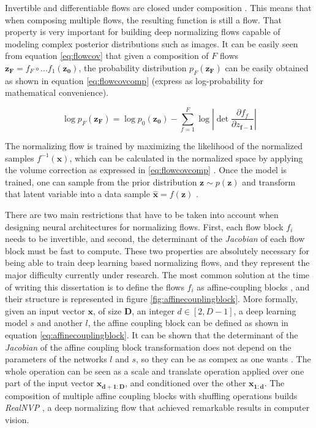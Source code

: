 Invertible and differentiable flows are closed under composition \autocite{kobyzev}. This means that when composing multiple flows, the resulting function is still a flow. That property is very important for building deep normalizing flows capable of modeling complex posterior distributions such as images. It can be easily seen from equation \ref{eq:flowcov}  \autocite{rezende2015} that given a composition of $F$ flows $\mathbf{z_F}=f_F \circ ... f_1(\mathbf{z_0})$, the probability distribution $p_F(\mathbf{z_F})$ can be easily obtained as shown in equation \ref{eq:flowcovcomp} (express as log-probability for mathematical convenience).

\begin{equation}
\label{eq:flowcovcomp}
\log p_F(\mathbf{z_F}) = \log p_0(\mathbf{z_0}) - \sum_{f=1}^{F} \log  \left| \det \frac{\partial f_f}{\partial z_{\mathbf{f-1}}} \right|
\end{equation}


The normalizing flow is trained by maximizing the likelihood of the normalized samples $f^{-1}(\mathbf{x})$, which can be calculated in the normalized space by applying the volume correction as expressed in \ref{eq:flowcovcomp} \autocite{papamakarios2017}. Once the model is trained, one can sample from the prior distribution $\mathbf{z} \sim p(\mathbf{z})$ and transform that latent variable into a data sample $\hat{\mathbf{x}} = f(\mathbf{z})$ \autocite{rezende2015}.

There are two main restrictions that have to be taken into account when designing neural architectures for normalizing flows. First, each flow block $f_i$ needs to be invertible, and second, the determinant of the \textit{Jacobian} of each flow block must be fast to compute. These two properties are absolutely necessary for being able to train deep learning based normalizing flows, and they represent the major difficulty currently under research. The most common solution at the time of writing this dissertation is to define the flows $f_i$ as affine-coupling blocks \autocite{dinh2018}, and their structure is represented in figure \ref{fig:affinecouplingblock}. More formally, given an input vector $\mathbf{x}$, of size $\mathbf{D}$, an integer $d \in [2,D-1]$, a deep learning model $s$ and another $l$, the affine coupling block can be defined as shown in equation \ref{eq:affinecouplingblock}. It can be shown that the determinant of the \textit{Jacobian} of the affine coupling block transformation does not depend on the parameters of the networks $l$ and $s$, so they can be as compex as one wants \autocite{dinh2018}. The whole operation can be seen as a scale and translate operation applied over one part of the input vector $\mathbf{x_{d+1:D}}$, and conditioned over the other $\mathbf{x_{1:d}}$. The composition of multiple affine coupling blocks with shuffling operations builds \textit{RealNVP} \autocite{dinh2018}, a deep normalizing flow that achieved remarkable results in computer vision.

